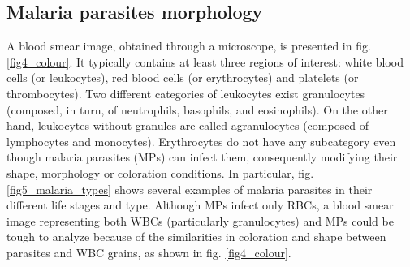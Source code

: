 \documentclass[final,a4paper,12pt,english]{UnicaPhdThesis3}
\begin{document}
{\subsection{Malaria parasites morphology}
A blood smear image, obtained through a microscope, is presented in fig. \ref{fig4_colour}. It typically contains at least three regions of interest: white blood cells (or leukocytes), red blood cells (or erythrocytes) and platelets (or thrombocytes). Two different categories of leukocytes exist granulocytes (composed, in turn, of neutrophils, basophils, and eosinophils).
On the other hand, leukocytes without granules are called agranulocytes (composed of lymphocytes and monocytes). Erythrocytes do not have any subcategory even though malaria parasites (MPs) can infect them, consequently modifying their shape, morphology or coloration conditions. In particular, fig. \ref{fig5_malaria_types} shows several examples of malaria parasites in their different life stages and type.
Although MPs infect only RBCs, a blood smear image representing both WBCs (particularly granulocytes) and MPs could be tough to analyze because of the similarities in coloration and shape between parasites and WBC grains, as shown in fig. \ref{fig4_colour}.

}
\end{document}
